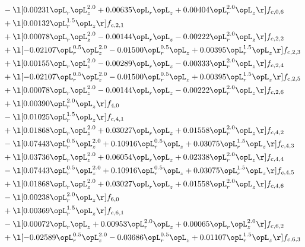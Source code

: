 \begin{alignat}{2}
& - \l[  0.00231 \opL_r \opL_z^{2.0} +  0.00635 \opL_r \opL_z +  0.00404 \opL_r^{2.0} \opL_z  \r] f_{c,0,6} \nonumber \\ 
& + \l[  0.00132 \opL_r^{1.5} \opL_z  \r] f_{c,2,1} \nonumber \\ 
& + \l[  0.00078 \opL_r \opL_z^{2.0}   -0.00144 \opL_r \opL_z   -0.00222 \opL_r^{2.0} \opL_z  \r] f_{c,2,2} \nonumber \\ 
& + \l[  -0.02107 \opL_r^{0.5} \opL_z^{2.0}   -0.01500 \opL_r^{0.5} \opL_z +  0.00395 \opL_r^{1.5} \opL_z  \r] f_{c,2,3} \nonumber \\ 
& + \l[  0.00155 \opL_r \opL_z^{2.0}   -0.00289 \opL_r \opL_z   -0.00333 \opL_r^{2.0} \opL_z  \r] f_{c,2,4} \nonumber \\ 
& + \l[  -0.02107 \opL_r^{0.5} \opL_z^{2.0}   -0.01500 \opL_r^{0.5} \opL_z +  0.00395 \opL_r^{1.5} \opL_z  \r] f_{c,2,5} \nonumber \\ 
& + \l[  0.00078 \opL_r \opL_z^{2.0}   -0.00144 \opL_r \opL_z   -0.00222 \opL_r^{2.0} \opL_z  \r] f_{c,2,6} \nonumber \\ 
& + \l[  0.00390 \opL_r^{2.0} \opL_z  \r] f_{4,0} \nonumber \\ 
& - \l[  0.01025 \opL_r^{1.5} \opL_z  \r] f_{c,4,1} \nonumber \\ 
& + \l[  0.01868 \opL_r \opL_z^{2.0} +  0.03027 \opL_r \opL_z +  0.01558 \opL_r^{2.0} \opL_z  \r] f_{c,4,2} \nonumber \\ 
& - \l[  0.07443 \opL_r^{0.5} \opL_z^{2.0} +  0.10916 \opL_r^{0.5} \opL_z +  0.03075 \opL_r^{1.5} \opL_z  \r] f_{c,4,3} \nonumber \\ 
& + \l[  0.03736 \opL_r \opL_z^{2.0} +  0.06054 \opL_r \opL_z +  0.02338 \opL_r^{2.0} \opL_z  \r] f_{c,4,4} \nonumber \\ 
& - \l[  0.07443 \opL_r^{0.5} \opL_z^{2.0} +  0.10916 \opL_r^{0.5} \opL_z +  0.03075 \opL_r^{1.5} \opL_z  \r] f_{c,4,5} \nonumber \\ 
& + \l[  0.01868 \opL_r \opL_z^{2.0} +  0.03027 \opL_r \opL_z +  0.01558 \opL_r^{2.0} \opL_z  \r] f_{c,4,6} \nonumber \\ 
& - \l[  0.00238 \opL_r^{2.0} \opL_z  \r] f_{6,0} \nonumber \\ 
& + \l[  0.00369 \opL_r^{1.5} \opL_z  \r] f_{c,6,1} \nonumber \\ 
& - \l[  0.00072 \opL_r \opL_z +  0.00953 \opL_r^{2.0} \opL_z +  0.00065 \opL_r \opL_z^{2.0}  \r] f_{c,6,2} \nonumber \\ 
& + \l[  -0.02589 \opL_r^{0.5} \opL_z^{2.0}   -0.03686 \opL_r^{0.5} \opL_z +  0.01107 \opL_r^{1.5} \opL_z  \r] f_{c,6,3} \nonumber \\ 

\end{alignat}
